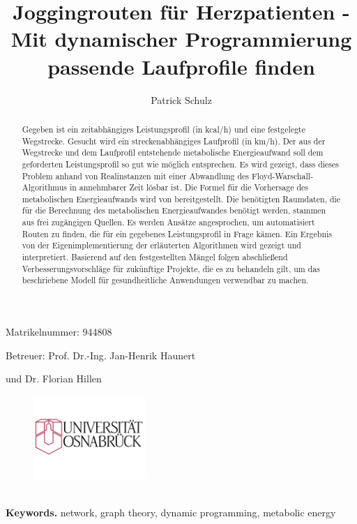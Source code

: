 \documentclass[12pt]{article}
\begin{document}

\title{Joggingrouten für Herzpatienten - Mit dynamischer Programmierung passende Laufprofile finden}
\author{Patrick Schulz}

\maketitle

\bigskip
\begin{center} Matrikelnummer: 944808\end{center}

\bigskip
\bigskip
\begin{center} Betreuer: Prof. Dr.-Ing. Jan-Henrik Haunert\end{center}
\begin{center} und Dr. Florian Hillen\end{center}

\bigskip
\bigskip
\bigskip

\begin{figure}[b]
\begin{center} \includegraphics[height=120px]{pics/Logo_Osna.jpg} \end{center}
\end{figure}

\pagebreak

\begin{abstract}
Gegeben ist ein zeitabhängiges Leistungsprofil (in kcal/h) und eine festgelegte Wegstrecke. Gesucht wird ein streckenabhängiges Laufprofil (in km/h). Der aus der Wegstrecke und dem Laufprofil entstehende metabolische Energieaufwand soll dem geforderten Leistungsprofil so gut wie möglich entsprechen. Es wird gezeigt, dass dieses Problem anhand von Realinstanzen mit einer Abwandlung des Floyd-Warschall-Algorithmus in annehmbarer Zeit lösbar ist. Die Formel für die Vorhersage des metabolischen Energieaufwands wird von \cite{givoni1971} bereitgestellt. Die benötigten Raumdaten, die für die Berechnung des metabolischen Energieaufwandes benötigt werden, stammen aus frei zugängigen Quellen. Es werden Ansätze angesprochen, um automatisiert Routen zu finden, die für ein gegebenes Leistungsprofil in Frage kämen. Ein Ergebnis von der Eigenimplementierung der erläuterten Algorithmen wird gezeigt und interpretiert. Basierend auf den festgestellten Mängel folgen abschließend Verbesserungsvorschläge für zukünftige Projekte, die es zu behandeln gilt, um das beschriebene Modell für gesundheitliche Anwendungen verwendbar zu machen.
\end{abstract}
\medskip
\noindent 
\\
\textbf{Keywords.} network, graph theory, dynamic programming, metabolic energy
\end{document}
